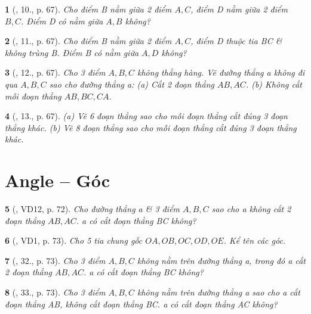 \documentclass{article}
\newtheorem{baitoan}{}
\begin{document}
\begin{baitoan}[\cite{Binh_Toan_6_tap_2}, 10., p. 67]
	Cho điểm B nằm giữa 2 điểm $A,C$, điểm D nằm giữa 2 điểm $B,C$. Điểm D có nằm giữa $A,B$ không?
\end{baitoan}

\begin{baitoan}[\cite{Binh_Toan_6_tap_2}, 11., p. 67]
	Cho điểm B nằm giữa 2 điểm $A,C$, điểm D thuộc tia BC \& không trùng B. Điểm B có nằm giữa $A,D$ không?
\end{baitoan}

\begin{baitoan}[\cite{Binh_Toan_6_tap_2}, 12., p. 67]
	Cho 3 điểm $A,B,C$ không thẳng hàng. Vẽ đường thẳng a không đi qua $A,B,C$ sao cho đường thẳng a: (a) Cắt 2 đoạn thẳng $AB,AC$. (b) Không cắt mỗi đoạn thẳng $AB,BC,CA$.
\end{baitoan}

\begin{baitoan}[\cite{Binh_Toan_6_tap_2}, 13., p. 67]
	(a) Vẽ 6 đoạn thẳng sao cho mỗi đoạn thẳng cắt đúng 3 đoạn thẳng khác. (b) Vẽ 8 đoạn thẳng sao cho mỗi đoạn thẳng cắt đúng 3 đoạn thẳng khác.
\end{baitoan}


\section{Angle -- Góc}

\begin{baitoan}[\cite{Binh_Toan_6_tap_2}, VD12, p. 72]
	Cho đường thẳng a \& 3 điểm $A,B,C$ sao cho a không cắt 2 đoạn thẳng $AB,AC$. a có cắt đoạn thẳng BC không?
\end{baitoan}

\begin{baitoan}[\cite{Binh_Toan_6_tap_2}, VD1, p. 73]
	Cho 5 tia chung gốc $OA,OB,OC,OD,OE$. Kể tên các góc.
\end{baitoan}

\begin{baitoan}[\cite{Binh_Toan_6_tap_2}, 32., p. 73]
	Cho 3 điểm $A,B,C$ không nằm trên đường thẳng a, trong đó a cắt 2 đoạn thẳng $AB,AC$. a có cắt đoạn thẳng BC không?
\end{baitoan}

\begin{baitoan}[\cite{Binh_Toan_6_tap_2}, 33., p. 73]
	Cho 3 điểm $A,B,C$ không nằm trên đường thẳng a sao cho a cắt đoạn thẳng AB, không cắt đoạn thẳng BC. a có cắt đoạn thẳng AC không?
\end{baitoan}
\end{document}

